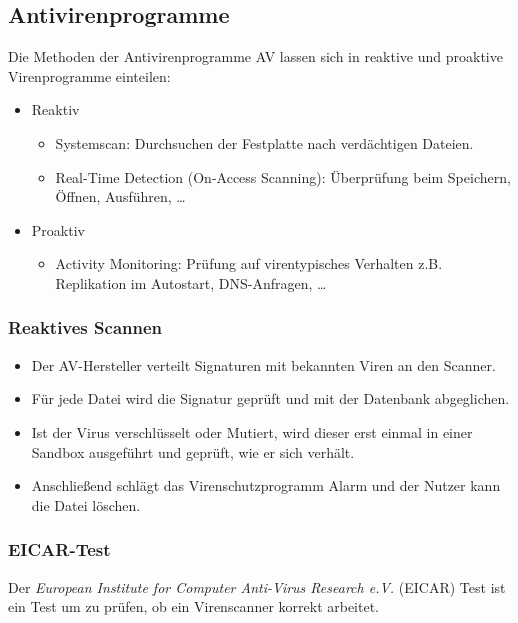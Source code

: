 \documentclass[a4paper, 11pt, accentcolor = tud3b]{tudreport}
\begin{document}
            \subsection{Antivirenprogramme}
                Die Methoden der Antivirenprogramme AV lassen sich in reaktive und proaktive Virenprogramme einteilen:
                \begin{itemize}
	                \item Reaktiv
		                \begin{itemize}
		                	\item Systemscan: Durchsuchen der Festplatte nach verdächtigen Dateien.
		                	\item Real-Time Detection (On-Access Scanning): Überprüfung beim Speichern, Öffnen, Ausführen, \dots
		                \end{itemize}
	                \item Proaktiv
		                \begin{itemize}
		                	\item Activity Monitoring: Prüfung auf virentypisches Verhalten z.B. Replikation im Autostart, DNS-Anfragen, \dots
		                \end{itemize}
                \end{itemize}

                \subsubsection{Reaktives Scannen}
                    \begin{itemize}
                    	\item Der AV-Hersteller verteilt Signaturen mit bekannten Viren an den Scanner.
                    	\item Für jede Datei wird die Signatur geprüft und mit der Datenbank abgeglichen.
                    	\item Ist der Virus verschlüsselt oder Mutiert, wird dieser erst einmal in einer Sandbox ausgeführt und geprüft, wie er sich verhält.
                    	\item Anschließend schlägt das Virenschutzprogramm Alarm und der Nutzer kann die Datei löschen.
                    \end{itemize}

                \subsubsection{EICAR-Test}
                    Der \textit{European Institute for Computer Anti-Virus Research e.V.} (EICAR) Test ist ein Test um zu prüfen, ob ein Virenscanner korrekt arbeitet.
                    
\end{document}
